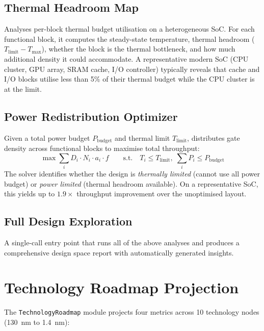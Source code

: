 \documentclass[11pt,twocolumn]{article}
\begin{document}
\subsection{Thermal Headroom Map}

Analyses per-block thermal budget utilisation on a heterogeneous SoC.
For each functional block, it computes the steady-state temperature,
thermal headroom ($T_{\mathrm{limit}} - T_{\max}$), whether the block
is the thermal bottleneck, and how much additional density it could
accommodate. A representative modern SoC (CPU cluster, GPU array, SRAM
cache, I/O controller) typically reveals that cache and I/O blocks
utilise less than 5\% of their thermal budget while the CPU cluster is
at the limit.

\subsection{Power Redistribution Optimizer}

Given a total power budget $P_{\mathrm{budget}}$ and thermal limit
$T_{\mathrm{limit}}$, distributes gate density across functional
blocks to maximise total throughput:
\begin{equation}
  \max \sum_i D_i \cdot N_i \cdot a_i \cdot f \qquad
  \text{s.t.} \quad T_i \leq T_{\mathrm{limit}}, \;
  \sum_i P_i \leq P_{\mathrm{budget}}
  \label{eq:optim}
\end{equation}
The solver identifies whether the design is \emph{thermally limited}
(cannot use all power budget) or \emph{power limited} (thermal headroom
available). On a representative SoC, this yields up to $1.9\times$
throughput improvement over the unoptimised layout.

\subsection{Full Design Exploration}

A single-call entry point that runs all of the above analyses and
produces a comprehensive design space report with automatically
generated insights.


\section{Technology Roadmap Projection}
\label{sec:roadmap}

The \texttt{TechnologyRoadmap} module projects four metrics across 10
technology nodes (130~nm to 1.4~nm):
\end{document}
